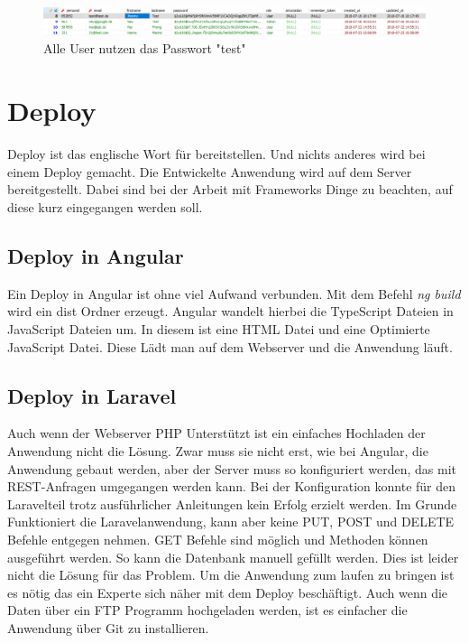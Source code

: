 \begin{figure}[H]
	\centering
	\includegraphics[scale=0.45]{content/pictures/passwort.png}
	\caption{Alle User nutzen das Passwort "test"}
	\label{fig:password}
\end{figure}


\section{Deploy}
Deploy ist das englische Wort für bereitstellen. Und nichts anderes wird bei einem Deploy gemacht. Die Entwickelte Anwendung wird auf dem Server bereitgestellt. Dabei sind bei der Arbeit mit Frameworks Dinge zu beachten, auf diese kurz eingegangen werden soll.

\subsection{Deploy in Angular}
Ein Deploy in Angular ist ohne viel Aufwand verbunden. Mit dem Befehl \textit{ng build} wird ein dist Ordner erzeugt. Angular wandelt hierbei die TypeScript Dateien in JavaScript Dateien um. In diesem ist eine \ac{HTML} Datei und eine Optimierte JavaScript Datei. Diese Lädt man auf dem Webserver und die Anwendung läuft.

\subsection{Deploy in Laravel}
Auch wenn der Webserver \ac{PHP} Unterstützt ist ein einfaches Hochladen der Anwendung nicht die Lösung. Zwar muss sie nicht erst, wie bei Angular, die Anwendung gebaut werden, aber der Server muss so konfiguriert werden, das mit REST-Anfragen umgegangen werden kann. Bei der Konfiguration konnte für den Laravelteil trotz ausführlicher Anleitungen kein Erfolg erzielt werden. Im Grunde Funktioniert die Laravelanwendung, kann aber keine PUT, POST und DELETE Befehle entgegen nehmen. \autocite{Stauffer.2017} GET Befehle sind möglich und Methoden können ausgeführt werden. So kann die Datenbank manuell gefüllt werden. Dies ist leider nicht die Lösung für das Problem. Um die Anwendung zum laufen zu bringen ist es nötig das ein Experte sich näher mit dem Deploy beschäftigt. Auch wenn die Daten über ein \ac{FTP} Programm hochgeladen werden, ist es einfacher die Anwendung über Git zu installieren.